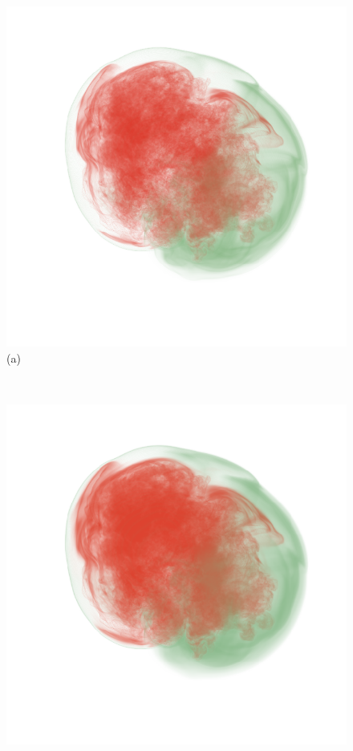 \documentclass[twoside,twocolumn,10pt]{article}
\begin{document}
\begin{figure}
	\centering
	\begin{minipage}{.16\textwidth}
		\centering
		\includegraphics[width=1\linewidth]{crop/supernova_merged_red_green}
		(a)
	\end{minipage}~
	\begin{minipage}{.16\textwidth}
		\centering
		\includegraphics[width=1\linewidth]{crop/supernova_merged_segment_red_green}

\end{minipage}
\end{figure}
\end{document}
